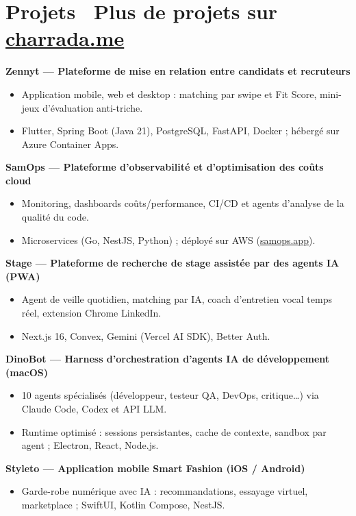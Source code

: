 \documentclass[10.5pt,a4paper]{article}
\newcommand{\project}[1]{\needspace{5\baselineskip}\noindent\textbf{#1}\par\vspace{2pt}}
\begin{document}
\section*{Projets \hfill {\normalsize\mdseries \faGlobe\ Plus de projets sur \href{https://www.charrada.me}{\textbf{charrada.me}}}}
\project{Zennyt — Plateforme de mise en relation entre candidats et recruteurs}
\begin{itemize}
  \item Application mobile, web et desktop : matching par swipe et Fit Score, mini-jeux d’évaluation anti-triche.
  \item Flutter, Spring Boot (Java 21), PostgreSQL, FastAPI, Docker ; hébergé sur Azure Container Apps.
\end{itemize}
\project{SamOps — Plateforme d’observabilité et d’optimisation des coûts cloud}
\begin{itemize}
  \item Monitoring, dashboards coûts/performance, CI/CD et agents d’analyse de la qualité du code.
  \item Microservices (Go, NestJS, Python) ; déployé sur AWS (\href{https://samops.app}{samops.app}).
\end{itemize}
\project{Stage — Plateforme de recherche de stage assistée par des agents IA (PWA)}
\begin{itemize}
  \item Agent de veille quotidien, matching par IA, coach d’entretien vocal temps réel, extension Chrome LinkedIn.
  \item Next.js 16, Convex, Gemini (Vercel AI SDK), Better Auth.
\end{itemize}
\project{DinoBot — Harness d’orchestration d’agents IA de développement (macOS)}
\begin{itemize}
  \item 10 agents spécialisés (développeur, testeur QA, DevOps, critique…) via Claude Code, Codex et API LLM.
  \item Runtime optimisé : sessions persistantes, cache de contexte, sandbox par agent ; Electron, React, Node.js.
\end{itemize}
\project{Styleto — Application mobile Smart Fashion (iOS / Android)}
\begin{itemize}
  \item Garde-robe numérique avec IA : recommandations, essayage virtuel, marketplace ; SwiftUI, Kotlin Compose, NestJS.
\end{itemize}
\end{document}
